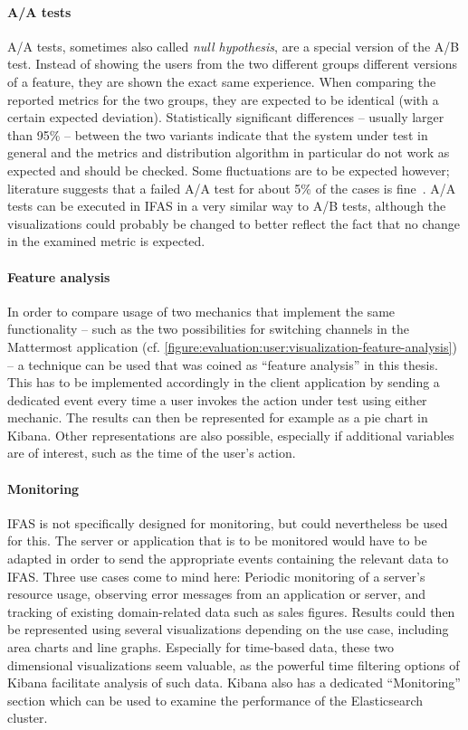 \paragraph{A/A tests}
A/A tests, sometimes also called \emph{null hypothesis}, are a special version of the A/B test.
Instead of showing the users from the two different groups different versions of a feature, they are shown the exact same experience.
When comparing the reported metrics for the two groups, they are expected to be identical (with a certain expected deviation).
Statistically significant differences -- usually larger than 95\% -- between the two variants indicate that the system under test in general and the metrics and distribution algorithm in particular do not work as expected and should be checked.
Some fluctuations are to be expected however; literature suggests that a failed A/A test for about 5\% of the cases is fine~\cite{Kohavi2009}.
A/A tests can be executed in \ac{IFAS} in a very similar way to A/B tests, although the visualizations could probably be changed to better reflect the fact that no change in the examined metric is expected.

\paragraph{Feature analysis}
In order to compare usage of two mechanics that implement the same functionality -- such as the two possibilities for switching channels in the Mattermost application (cf. \cref{figure:evaluation:user:visualization-feature-analysis}) -- a technique can be used that was coined as ``feature analysis'' in this thesis.
This has to be implemented accordingly in the client application by sending a dedicated event every time a user invokes the action under test using either mechanic.
The results can then be represented for example as a pie chart in Kibana.
Other representations are also possible, especially if additional variables are of interest, such as the time of the user's action.

\paragraph{Monitoring}
\ac{IFAS} is not specifically designed for monitoring, but could nevertheless be used for this.
The server or application that is to be monitored would have to be adapted in order to send the appropriate events containing the relevant data to \ac{IFAS}.
Three use cases come to mind here: Periodic monitoring of a server's resource usage, observing error messages from an application or server, and tracking of existing domain-related data such as sales figures.
Results could then be represented using several visualizations depending on the use case, including area charts and line graphs.
Especially for time-based data, these two dimensional visualizations seem valuable, as the powerful time filtering options of Kibana facilitate analysis of such data.
Kibana also has a dedicated ``Monitoring'' section which can be used to examine the performance of the Elasticsearch cluster.

